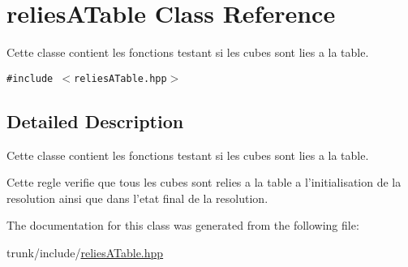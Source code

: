 \hypertarget{classreliesATable}{
\section{reliesATable Class Reference}
\label{classreliesATable}
}
Cette classe contient les fonctions testant si les cubes sont lies a la table.  


{\tt \#include $<$reliesATable.hpp$>$}



\subsection{Detailed Description}
Cette classe contient les fonctions testant si les cubes sont lies a la table. 

Cette regle verifie que tous les cubes sont relies a la table a l'initialisation de la resolution ainsi que dans l'etat final de la resolution. 

The documentation for this class was generated from the following file:\begin{CompactItemize}
\item 
trunk/include/\hyperlink{reliesATable_8hpp}{reliesATable.hpp}\end{CompactItemize}
